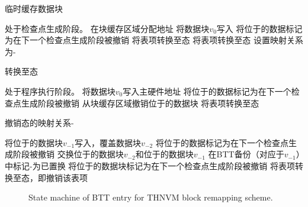 \begin{algorithm} [!h]
\caption{临时缓存数据块}
\label{alg-hold}
\begin{algorithmic}[1]
\Require 处于检查点生成阶段。
\State 在块缓存区域分配地址
\State 将数据块$v_0$写入
  \State 将位于的数据标记为在下一个检查点生成阶段被撤销
  \State 将表项转换至态
  \State 将表项转换至态
\EndIf
\State 设置映射关系为- 
\end{algorithmic}
\end{algorithm}

\begin{algorithm} [!h]
\caption{转换至态}
\label{alg-hide}
\begin{algorithmic}[1]
\Require 处于程序执行阶段。
\State 将数据块$v_0$写入主硬件地址 
  \State 将位于的数据标记为在下一个检查点生成阶段被撤销
  \State 从块缓存区域撤销位于的数据块
\EndIf
\State 将表项转换至态 
\end{algorithmic}
\end{algorithm}

\begin{algorithm} [!h]
\caption{撤销态的映射关系-}
\label{alg-free-c}
\begin{algorithmic}[1]
  \State 将位于的数据块$v_{-1}$写入，覆盖数据块$v_{-2}$ 
  \State 将位于的数据标记为在下一个检查点生成阶段被撤销
\Else {}
  \State 交换位于的数据块$v_{-2}$和位于的数据块$v_{-1}$ 
  \Statex {}
  \State 在BTT备份（对应于$v_{-1}$）中标记-为已置换
  \State 将位于的数据块标记为在下一个检查点生成阶段被撤销
\EndIf
\State 将表项转换至态，即撤销该表项 
\end{algorithmic}
\end{algorithm}

\begin{figure}[!t]
\centering

\caption{State machine of BTT entry for THNVM block remapping scheme.}
\label{fig:asm}
\end{figure}

